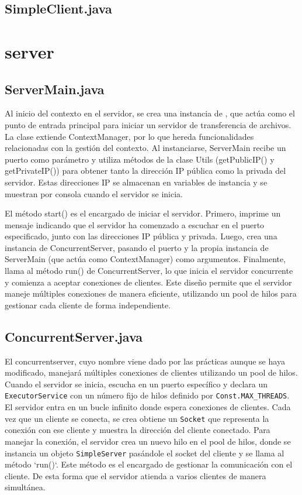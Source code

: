 \documentclass[a4paper, 12pt]{report}
\begin{document}
    \section{SimpleClient.java}

    \chapter{server}

    \section{ServerMain.java}

    Al inicio del contexto en el servidor, se crea una instancia de , que actúa como el punto de
    entrada principal para iniciar un servidor de transferencia de archivos. La clase extiende ContextManager,
    por lo que hereda funcionalidades relacionadas con la gestión del contexto. Al instanciarse, ServerMain recibe
    un puerto como parámetro y utiliza métodos de la clase Utils (getPublicIP() y getPrivateIP())
    para obtener tanto la dirección IP pública como la privada del
    servidor. Estas direcciones IP se almacenan en variables de instancia y se muestran por consola cuando el servidor se inicia.

    El método start()
    es el encargado de iniciar el servidor. Primero, imprime un mensaje
    indicando que el servidor ha comenzado a escuchar en el puerto
    especificado, junto con las direcciones IP pública y privada. Luego,
    crea una instancia de ConcurrentServer, pasando el puerto y la propia instancia de ServerMain (que actúa como ContextManager) como argumentos. Finalmente, llama al método run() de ConcurrentServer,
    lo que inicia el servidor concurrente y comienza a aceptar conexiones
    de clientes. Este diseño permite que el servidor maneje múltiples
    conexiones de manera eficiente, utilizando un pool de hilos para
    gestionar cada cliente de forma independiente.



    \section{ConcurrentServer.java}

    El concurrentserver, cuyo nombre viene dado por las prácticas aunque se haya modificado, manejará múltiples
    conexiones de clientes utilizando un pool de hilos. Cuando el servidor se inicia, escucha en un puerto
    específico y declara un \texttt{ExecutorService}  con un número fijo de hilos definido por
    \texttt{Const.MAX_THREADS}. El servidor entra en un bucle infinito donde espera conexiones de clientes. Cada
    vez que un cliente se conecta, se crea obtiene un \texttt{Socket} que
    representa la conexión con ese cliente y muestra la dirección del cliente
    conectado. Para manejar la conexión, el servidor crea un nuevo hilo en el pool de hilos, donde se instancia un
    objeto \texttt{SimpleServer} pasándole el socket del cliente y se llama al método `run()`. Este método es el
    encargado de gestionar la comunicación con el cliente. De esta forma que el servidor atienda a varios
    clientes de manera simultánea.
\end{document}
